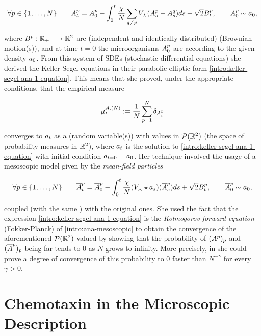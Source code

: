 \begin{equation}
		\forall p \in \{1, \ldots, N\}
		\qquad 
		A_t^p = A_0^p - \int_0^t \frac{\chi}{N} \sum_{q\neq p} V_\curlywedge (A_s^p - A_s^q) ds + \sqrt{2} B_t^p,
		\qquad
		A_0^p \sim a_0
		,
\end{equation}

where $B^p: \mathbb{R}_+ \longrightarrow \mathbb{R}^2$ are \iid (independent and identically distributed) \Bm (Brownian motion(s)), and at time $t=0$ the microorganisms $A_0^p$ are \iid according to the given density $a_0$.
From this system of SDEs (stochastic differential equations) she derived the Keller-Segel equations in their parabolic-elliptic form \ref{intro:keller-segel-ana-1-equation}.
This means that she proved, under the appropriate conditions, that the empirical measure

\begin{equation*}
	\mu_t^{A,(N)}:= \frac{1}{N}\sum_{p=1}^N \delta_{A_t^p}
\end{equation*}

converges to $a_t$ as a \rv (random variable(s)) with values in $\mathcal{P}(\mathbb{R}^2)$ (the space of probability measures in $\mathbb{R}^2$), where $a_t$ is the solution to \ref{intro:keller-segel-ana-1-equation} with initial condition $a_{t=0} = a_0$.
Her technique involved the usage of a mesoscopic model given by the \iid \emph{mean-field particles}

\begin{equation}\label{intro:ana-mesoscopic}
	\forall p \in \{1, \ldots, N\}
	\qquad
	\overline{A}_t^p = \overline{A}_0^p - \int_0^t \frac{\chi}{N} (V_\curlywedge \star a_s )(\overline{A}_s^p) ds + \sqrt{2} B_t^p,
	\qquad
	\overline{A}_0^p \sim a_0
	,
\end{equation}

coupled (\ie with the same ) with the original ones.
She used the fact that the expression \ref{intro:keller-segel-ana-1-equation} is the \emph{Kolmogorov forward equation} (Fokker-Planck) of \ref{intro:ana-mesoscopic} to obtain the convergence of the aforementioned $\mathcal{P}(\mathbb{R}^2)$-valued \rv by showing that the probability of $(A^p)_p$ and $(\overline{A}^p)_p$ being far tends to $0$ as $N$ grows to infinity.
More precisely, in \cite[Theorem 2.1]{ana} she could prove a degree of convergence of this probability to $0$ faster than $N^{-\gamma}$ for every $\gamma > 0$.


\section{Chemotaxin in the Microscopic Description}

